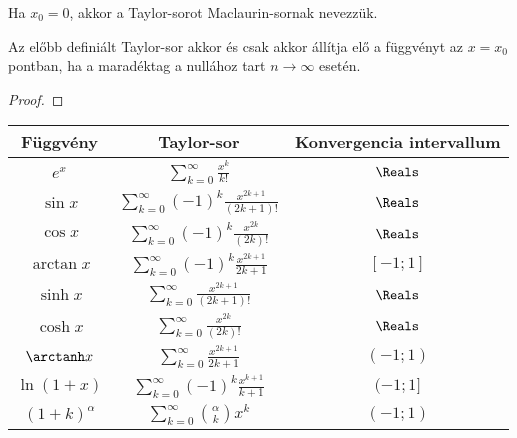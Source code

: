 \begin{note}
  Ha $x_0 = 0$, akkor a Taylor-sorot Maclaurin-sornak nevezzük.
\end{note}

\begin{theorem}
  Az előbb definiált Taylor-sor akkor és csak akkor állítja elő a függvényt
  az $x = x_0$ pontban, ha a maradéktag a nullához tart $n \to \infty$ esetén.

  \begin{proof}
    \vspace{10em}
  \end{proof}
\end{theorem}

\begin{blueBox}

  \begin{center}
    \setlength\extrarowheight{5pt}
    \renewcommand{\arraystretch}{1.5}
    \begin{tabular}{|c|c|c|}
      \hline
      Függvény         & Taylor-sor                                                         & Konvergencia intervallum
      \\[10pt]
      \hline
      $e^x$            & $\displaystyle\sum_{k=0}^{\infty} \frac{x^k}{k!}$                  & $\Reals$
      \\[10pt]
      \hline
      $\sin x$         & $\displaystyle\sum_{k=0}^{\infty} (-1)^k \frac{x^{2k+1}}{(2k+1)!}$ & $\Reals$
      \\[10pt]
      \hline
      $\cos x$         & $\displaystyle\sum_{k=0}^{\infty} (-1)^k \frac{x^{2k}}{(2k)!}$     & $\Reals$
      \\[10pt]
      \hline
      $\arctan x$      & $\displaystyle\sum_{k=0}^{\infty} (-1)^k \frac{x^{2k+1}}{2k+1}$    & $[-1; 1]$
      \\[10pt]
      \hline
      $\sinh x$        & $\displaystyle\sum_{k=0}^{\infty} \frac{x^{2k+1}}{(2k+1)!}$        & $\Reals$
      \\[10pt]
      \hline
      $\cosh x$        & $\displaystyle\sum_{k=0}^{\infty} \frac{x^{2k}}{(2k)!}$            & $\Reals$
      \\[10pt]
      \hline
      $\arctanh x$     & $\displaystyle\sum_{k=0}^{\infty} \frac{x^{2k+1}}{2k+1}$           & $(-1; 1)$
      \\[10pt]
      \hline
      $\ln(1 + x)$     & $\displaystyle\sum_{k=0}^{\infty} (-1)^{k} \frac{x^{k+1}}{k+1}$    & $(-1; 1]$
      \\[10pt]
      \hline
      $(1 + k)^\alpha$ & $\displaystyle\sum_{k=0}^{\infty} \binom{\alpha}{k} x^k$           & $(-1; 1)$
      \\[10pt]
      \hline
    \end{tabular}
  \end{center}
\end{blueBox}
